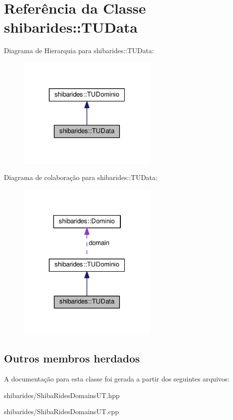 \hypertarget{classshibarides_1_1TUData}{}\section{Referência da Classe shibarides\+:\+:T\+U\+Data}
\label{classshibarides_1_1TUData}


Diagrama de Hierarquia para shibarides\+:\+:T\+U\+Data\+:\nopagebreak
\begin{figure}[H]
\begin{center}
\leavevmode
\includegraphics[width=196pt]{classshibarides_1_1TUData__inherit__graph}
\end{center}
\end{figure}


Diagrama de colaboração para shibarides\+:\+:T\+U\+Data\+:\nopagebreak
\begin{figure}[H]
\begin{center}
\leavevmode
\includegraphics[width=196pt]{classshibarides_1_1TUData__coll__graph}
\end{center}
\end{figure}
\subsection*{Outros membros herdados}


A documentação para esta classe foi gerada a partir dos seguintes arquivos\+:\begin{DoxyCompactItemize}
\item 
shibarides/Shiba\+Rides\+Domains\+U\+T.\+hpp\item 
shibarides/Shiba\+Rides\+Domains\+U\+T.\+cpp\end{DoxyCompactItemize}
